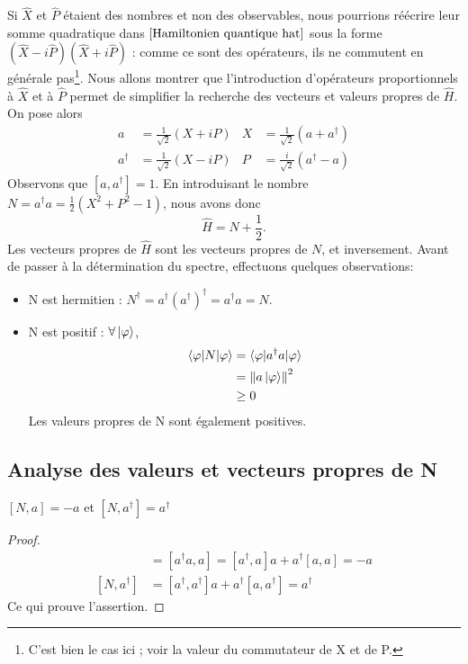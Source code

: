\documentclass[../notesdecours.tex]{subfiles}
\begin{document}
Si $\hat{X}$ et $\hat{P}$ étaient des nombres et non des observables, nous pourrions réécrire leur somme quadratique dans $\eqref{Hamiltonien quantique hat}$ sous la forme $(\hat{X}-i\hat{P})(\hat{X}+i\hat{P})$ : comme ce sont des opérateurs, ils ne commutent en générale pas\footnote{C'est bien le cas ici ; voir la valeur du commutateur de X et de P.}. Nous allons montrer que l'introduction d'opérateurs proportionnels à $\hat{X}$ et à $\hat{P}$ permet de simplifier la recherche des vecteurs et valeurs propres de $\hat{H}$. On pose alors
\begin{align}
    a &= \frac{1}{\sqrt{2}}(X+iP)   & X &= \frac{1}{\sqrt{2}}(a+a^\dagger)\\
    a^\dagger &= \frac{1}{\sqrt{2}}(X-iP)    & P &= \frac{i}{\sqrt{2}}(a^\dagger-a)
\end{align}
Observons que $[a,a^\dagger] = 1$. En introduisant le nombre $N = a^\dagger a = \frac{1}{2}\left(X^2+P^2-1\right)$, nous avons donc
\begin{equation}
    \hat{H} = N+\frac{1}{2}.
\end{equation}
Les vecteurs propres de $\hat{H}$ sont les vecteurs propres de $N$, et inversement. Avant de passer à la détermination du spectre, effectuons quelques observations:
\begin{itemize}
    \item N est hermitien : $N^\dagger = a^\dagger \left(a^\dagger\right)^\dagger = a^\dagger a = N$.
    \item N est positif : $\forall \ket{\varphi}$,
    \begin{align*}
        \braket{\varphi|N|\varphi} &= \braket{\varphi|a^\dagger a |\varphi}\\
        &= \norm{a\ket{\varphi}}^2\\
        &\geq 0
    \end{align*}
    Les valeurs propres de N sont également positives.
\end{itemize}

\subsection{Analyse des valeurs et vecteurs propres de N}

\begin{Property}[Coucou]
    $[N,a]=-a$ et $[N,a^\dagger] = a^\dagger$
\end{Property}
\begin{proof}
    \begin{align*}
        [N,a] &= [a^\dagger a,a] = [a^\dagger,a]a+a^\dagger [a,a] = -a\\
        [N,a^\dagger] &= [a^\dagger,a^\dagger]a+a^\dagger [a,a^\dagger] = a^\dagger
    \end{align*}
    Ce qui prouve l'assertion.
\end{proof}
\end{document}

